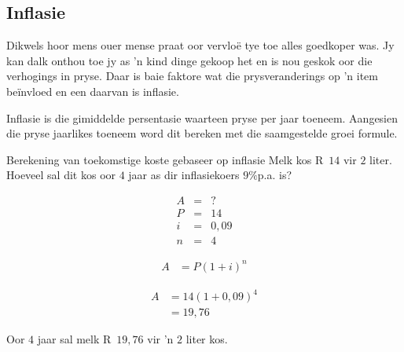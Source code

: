 \subsection{Inflasie}

Dikwels hoor mens ouer mense praat oor vervlo\"e tye toe alles goedkoper was. Jy kan dalk onthou toe jy as 'n kind dinge gekoop het en is nou geskok oor die verhogings in pryse. Daar is baie faktore wat die prysveranderings op 'n item be\"invloed en een daarvan is inflasie.\par

Inflasie is die gimiddelde persentasie waarteen pryse per jaar toeneem. Aangesien die pryse jaarlikes toeneem word dit bereken met die saamgestelde groei formule.


\begin{wex}{Berekening van toekomstige koste gebaseer op inflasie}
    {Melk kos R~$14$ vir $2$ liter. Hoeveel sal dit kos oor $4$ jaar as dir inflasiekoers $9\%$p.a. is?}{
    
    \begin{eqnarray*}
	A &=& ?\\
	P &=& 14\\
	i &=& 0,09\\
	n &=& 4
    \end{eqnarray*}

    \begin{align*}
	A &= P(1 + i)^n
    \end{align*}

    \begin{align*}
	A &= 14(1 + 0,09)^4\\
	  &= 19,76
    \end{align*}

    Oor $4$ jaar sal melk R~$19,76$ vir 'n $2$ liter kos.
    }
\end{wex}


